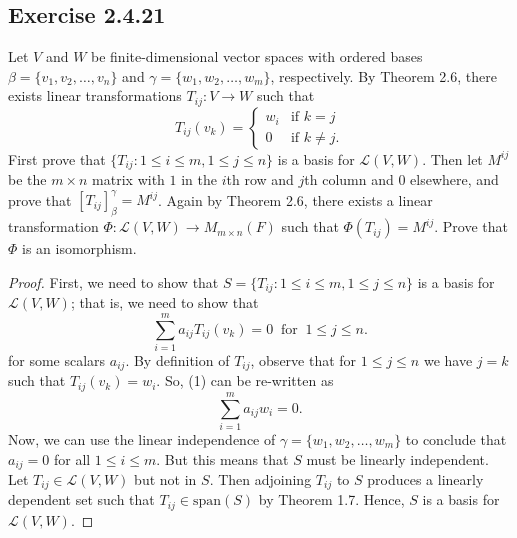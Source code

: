 \subsection*{Exercise 2.4.21} Let \( V  \) and \( W  \) be finite-dimensional vector spaces with ordered bases \( \beta = \{ {v}_{1}, {v}_{2}, \dots, {v}_{n} \}  \) and \( \gamma = \{ {w}_{1}, {w}_{2}, \dots, {w}_{m} \}  \), respectively. By Theorem 2.6, there exists linear transformations \( {T}_{ij}: V \to W  \) such that
\[  {T}_{ij}({v}_{k }) = 
\begin{cases}
    {w}_{i} &\text{if } k = j \\
    0 &\text{if } k \neq j. 
\end{cases} \]
First prove that \( \{ {T}_{ij} : 1 \leq i \leq m, 1 \leq j \leq n  \}  \) is a basis for \( \mathcal{L}(V,W)  \). Then let \( M^{ij}  \) be the \( m \times n  \) matrix with \( 1  \) in the \( i \)th row and \( j \)th column and \( 0  \) elsewhere, and prove that \( [{T}_{ij}]_{\beta}^{\gamma}  = M^{ij}  \). Again by Theorem 2.6, there exists a linear transformation \( \Phi: \mathcal{L}(V,W) \to {M}_{m \times n}(F)   \) such that \( \Phi({T}_{ij}) = M^{ij} \). Prove that \( \Phi  \) is an isomorphism.
\begin{proof}
    First, we need to show that \( S = \{ {T}_{ij}: 1 \leq i \leq m, 1 \leq j \leq n  \}  \) is a basis for \( \mathcal{L}(V,W) \); that is, we need to show that
    \[  \sum_{ i=1  }^{ m } {a}_{ij} T_{ij}({v}_{k})= 0 \ \text{ for } \ 1 \leq j \leq n. \tag{1}  \]
    for some scalars \( {a}_{ij}  \). By definition of \( {T}_{ij}  \), observe that for \( 1 \leq j \leq n   \) we have \( j = k  \) such that \( {T}_{ij}({v}_{k }) = {w}_{i} \). So, (1) can be re-written as 
    \[ \sum_{ i=1  }^{ m  } {a}_{ij} {w}_{i} = 0.  \]
    Now, we can use the linear independence of \( \gamma = \{ {w}_{1}, {w}_{2}, \dots, {w}_{m} \}  \) to conclude that \( {a}_{ij} = 0  \) for all \( 1 \leq i \leq m  \). But this means that \( S  \) must be linearly independent. Let \( {T}_{ij} \in \mathcal{L}(V,W)  \) but not in \( S  \). Then adjoining \( {T}_{ij}  \) to \( S  \) produces a linearly dependent set such that \( {T}_{ij} \in \text{span}(S)  \) by Theorem 1.7. Hence, \( S  \) is a basis for \( \mathcal{L}(V,W) \).
\end{proof}

